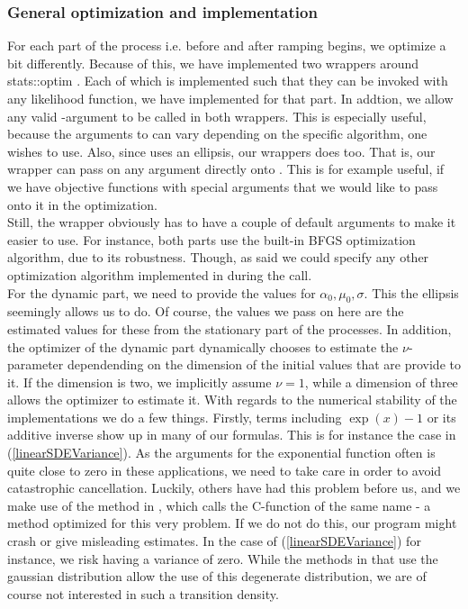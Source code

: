 \subsubsection{General optimization and implementation}
For each part of the process i.e. before and after ramping begins, we optimize a bit differently. Because of this, we have implemented two wrappers around {stats::optim} \cite{Rlang}. Each of which is implemented such that they can be invoked with any likelihood function, we have implemented for that part. In addtion, we allow any valid -argument to be called in both wrappers. This is especially useful, because the arguments to  can vary depending on the specific algorithm, one wishes to use. Also, since  uses an ellipsis, our wrappers does too. That is, our wrapper can pass on any argument directly onto . This is for example useful, if we have objective functions with special arguments that we would like to pass onto it in the optimization.\\
Still, the wrapper obviously has to have a couple of default arguments to make it easier to use. For instance, both parts use the built-in BFGS optimization algorithm, due to its robustness. Though, as said we could specify any other optimization algorithm implemented in  during the call.\\ For the dynamic part, we need to provide the values for $\alpha_0, \mu_0, \sigma$. This the ellipsis seemingly allows us to do. Of course, the values we pass on here are the estimated values for these from the stationary part of the processes. In addition, the optimizer of the dynamic part dynamically chooses to estimate the $\nu$-parameter dependending on the dimension of the initial values that are provide to it. If the dimension is two, we implicitly assume $\nu = 1$, while a dimension of three allows the optimizer to estimate it. With regards to the numerical stability of the implementations we do a few things. Firstly, terms including $\exp\left(x\right) - 1$ or its additive inverse show up in many of our formulas. This is for instance the case in (\ref{linearSDEVariance}). As the arguments for the exponential function often is quite close to zero in these applications, we need to take care in order to avoid catastrophic cancellation. Luckily, others have had this problem before us, and we make use of the  method in , which calls the C-function of the same name \cite{cppreference_expm1} - a method optimized for this very problem. If we do not do this, our program might crash or give misleading estimates. In the case of (\ref{linearSDEVariance}) for instance, we risk having a variance of zero. While the methods in  that use the gaussian distribution allow the use of this degenerate distribution, we are of course not interested in such a transition density.
